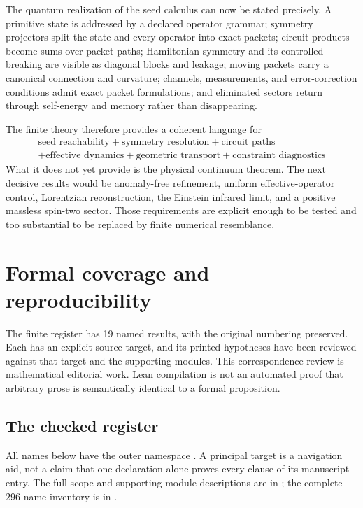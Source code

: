 \documentclass[11pt]{article}
\theoremstyle{definition}
\theoremstyle{remark}
\begin{document}
The quantum realization of the seed calculus can now be stated precisely. A primitive state is addressed by a declared operator grammar; symmetry projectors split the state and every operator into exact packets; circuit products become sums over packet paths; Hamiltonian symmetry and its controlled breaking are visible as diagonal blocks and leakage; moving packets carry a canonical connection and curvature; channels, measurements, and error-correction conditions admit exact packet formulations; and eliminated sectors return through self-energy and memory rather than disappearing.

The finite theory therefore provides a coherent language for
\[
\boxed{
\begin{gathered}
\text{seed reachability}
+
\text{symmetry resolution}
+
\text{circuit paths}\\
+
\text{effective dynamics}
+
\text{geometric transport}
+
\text{constraint diagnostics}
\end{gathered}
}
\]
What it does not yet provide is the physical continuum theorem. The next decisive results would be anomaly-free refinement, uniform effective-operator control, Lorentzian reconstruction, the Einstein infrared limit, and a positive massless spin-two sector. Those requirements are explicit enough to be tested and too substantial to be replaced by finite numerical resemblance.


\appendix
\section{Formal coverage and reproducibility}
\label{sec:formal-coverage}

The finite register has 19 named results, with the original numbering preserved. Each has an explicit source target, and its printed hypotheses have been reviewed against that target and the supporting modules. This correspondence review is mathematical editorial work. Lean compilation is not an automated proof that arbitrary prose is semantically identical to a formal proposition.

\subsection{The checked register}
All names below have the outer namespace . A principal target is a navigation aid, not a claim that one declaration alone proves every clause of its manuscript entry. The full scope and supporting module descriptions are in ; the complete 296-name inventory is in .
\end{document}

